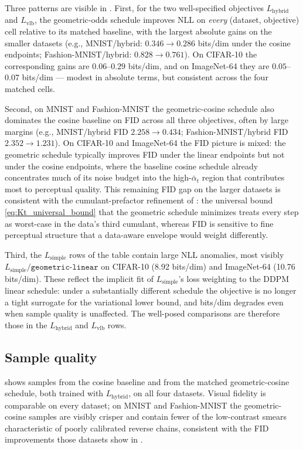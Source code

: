 \documentclass[11pt]{article}
\begin{document}
Three patterns are visible in . First, for the two well-specified objectives \(L_{\mathrm{hybrid}}\) and \(L_{\mathrm{vlb}}\), the geometric-odds schedule improves NLL on \emph{every} (dataset, objective) cell relative to its matched baseline, with the largest absolute gains on the smaller datasets (e.g., MNIST/hybrid: \(0.346\to 0.286\) bits/dim under the cosine endpoints; Fashion-MNIST/hybrid: \(0.828\to 0.761\)). On CIFAR-10 the corresponding gains are \(0.06\)–\(0.29\) bits/dim, and on ImageNet-64 they are \(0.05\)–\(0.07\) bits/dim --- modest in absolute terms, but consistent across the four matched cells.

Second, on MNIST and Fashion-MNIST the geometric-cosine schedule also dominates the cosine baseline on FID across all three objectives, often by large margins (e.g., MNIST/hybrid FID \(2.258\to 0.434\); Fashion-MNIST/hybrid FID \(2.352\to 1.231\)). On CIFAR-10 and ImageNet-64 the FID picture is mixed: the geometric schedule typically improves FID under the linear endpoints but not under the cosine endpoints, where the baseline cosine schedule already concentrates much of its noise budget into the high-\(\bar\alpha_t\) region that contributes most to perceptual quality. This remaining FID gap on the larger datasets is consistent with the cumulant-prefactor refinement of : the universal bound \eqref{eq:Kt_universal_bound} that the geometric schedule minimizes treats every step as worst-case in the data's third cumulant, whereas FID is sensitive to fine perceptual structure that a data-aware envelope would weight differently.

Third, the \(L_{\mathrm{simple}}\) rows of the table contain large NLL anomalies, most visibly \(L_{\mathrm{simple}}/\texttt{geometric-linear}\) on CIFAR-10 (8.92 bits/dim) and ImageNet-64 (10.76 bits/dim). These reflect the implicit fit of \(L_{\mathrm{simple}}\)'s loss weighting to the DDPM linear schedule: under a substantially different schedule the objective is no longer a tight surrogate for the variational lower bound, and bits/dim degrades even when sample quality is unaffected. The well-posed comparisons are therefore those in the \(L_{\mathrm{hybrid}}\) and \(L_{\mathrm{vlb}}\) rows.

\subsection{Sample quality}
\label{sec:exp_samples}

 shows samples from the cosine baseline and from the matched geometric-cosine schedule, both trained with \(L_{\mathrm{hybrid}}\), on all four datasets. Visual fidelity is comparable on every dataset; on MNIST and Fashion-MNIST the geometric-cosine samples are visibly crisper and contain fewer of the low-contrast smears characteristic of poorly calibrated reverse chains, consistent with the FID improvements those datasets show in .
\end{document}
